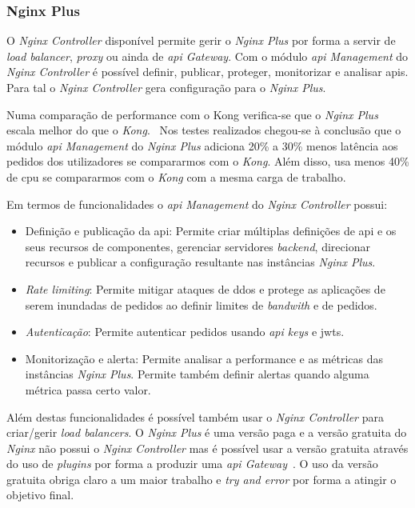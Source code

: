 \subsubsection{Nginx Plus}

O \textit{Nginx Controller} disponível permite gerir o \textit{Nginx Plus} por forma a servir de \textit{load balancer}, \textit{proxy} ou ainda de \textit{\acrshort{api} Gateway}. Com o módulo \textit{\acrshort{api} Management} do \textit{Nginx Controller} é possível definir, publicar, proteger, monitorizar e analisar \acrshort{api}s. Para tal o \textit{Nginx Controller} gera configuração para o \textit{Nginx Plus}.

Numa comparação de performance com o Kong verifica-se que o \textit{Nginx Plus} escala melhor do que o \textit{Kong}.~\cite{nginxPvsKong} Nos testes realizados chegou-se à conclusão que o módulo \textit{\acrshort{api} Management} do \textit{Nginx Plus} adiciona 20\% a 30\% menos latência aos pedidos dos utilizadores se compararmos com o \textit{Kong}. Além disso, usa menos 40\% de \acrshort{cpu} se compararmos com o \textit{Kong} com a mesma carga de trabalho.

Em termos de funcionalidades o \textit{\acrshort{api} Management} do \textit{Nginx Controller} possui:~\cite{nginxP}
\begin{itemize}
    \item Definição e publicação da \acrshort{api}: Permite criar múltiplas definições de \acrshort{api} e os seus recursos de componentes, gerenciar servidores \textit{backend}, direcionar recursos e publicar a configuração resultante nas instâncias \textit{Nginx Plus}.
    \item \textit{Rate limiting}: Permite mitigar ataques de \acrshort{ddos} e protege as aplicações de serem inundadas de pedidos ao definir limites de \textit{bandwith} e de pedidos.
    \item \textit{Autenticação}: Permite autenticar pedidos usando \textit{\acrshort{api} keys} e \acrshort{jwt}s.
    \item Monitorização e alerta: Permite analisar a performance e as métricas das instâncias \textit{Nginx Plus}. Permite também definir alertas quando alguma métrica passa certo valor.
\end{itemize}

Além destas funcionalidades é possível também usar o \textit{Nginx Controller} para criar/gerir \textit{load balancers}. O \textit{Nginx Plus} é uma versão paga e a versão gratuita do \textit{Nginx} não possui o \textit{Nginx Controller} mas é possível usar a versão gratuita através do uso de \textit{plugins} por forma a produzir uma \textit{\acrshort{api} Gateway}~\cite{compAPIGat}. O uso da versão gratuita obriga claro a um maior trabalho e \textit{try and error} por forma a atingir o objetivo final.

